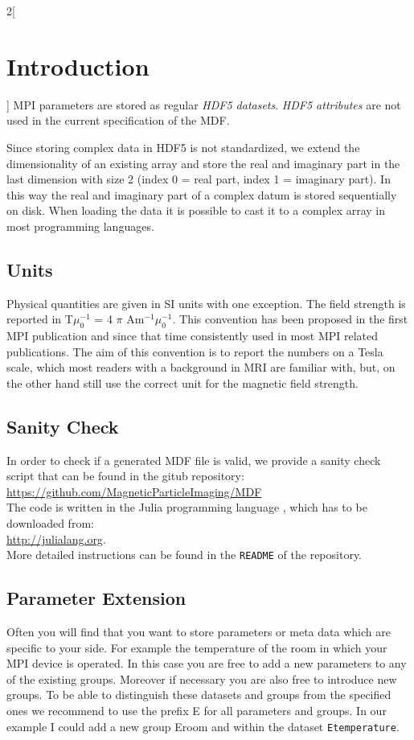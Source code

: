 \documentclass[landscape,a4paper]{article} %
\newcommand{\inl}[1]{\lstinline[columns=fixed]{#1}}
\newcommand{\inlvar}[1]{{\ttfamily#1}}
\begin{document}
\begin{multicols}{2}[\section{Introduction} \label{Sec:Introduction}]
MPI parameters are stored as regular \textit{HDF5 datasets}. \textit{HDF5 attributes} are not used in the current specification of the MDF.

Since storing complex data in HDF5 is not standardized, we extend the dimensionality of an existing array and store the real and imaginary part in the last dimension with size 2 (index 0 = real part, index 1 = imaginary part). In this way the real and imaginary part of a complex datum is stored sequentially on disk. When loading the data it is possible to cast it to a complex array in most programming languages.

\subsection{Units}

Physical quantities are given in SI units with one exception. The field strength is reported in T$\mu_0^{-1}$ = 4 $\pi$ Am$^{-1}\mu_0^{-1}$. This convention has been proposed in the first MPI publication and since that time consistently used in most MPI related publications. The aim of this convention is to report the numbers on a Tesla scale, which most readers with a background in MRI are familiar with, but, on the other hand still use the correct unit for the magnetic field strength.


\subsection{Sanity Check}

In order to check if a generated MDF file is valid, we provide a sanity check script that can be found in the gitub repository:\\
\hspace*{1cm}\url{https://github.com/MagneticParticleImaging/MDF}\\
The code is written in the Julia programming language \cite{Bezanson2012,Bezanson2014,Bezanson2014a}, which has to be downloaded from: \\
\hspace*{1cm} \url{http://julialang.org}.\\
More detailed instructions can be found in the \texttt{README} of the repository.

\subsection{Parameter Extension}

Often you will find that you want to store parameters or meta data which are specific to your side. For example the temperature of the room in which your MPI device is operated. In this case you are free to add a new parameters to any of the existing groups. Moreover if necessary you are also free to introduce new groups. To be able to distinguish these datasets and groups from the specified ones we recommend to use the prefix \inlvar{E} for all parameters and groups. In our example I could add a new group \inlvar{Eroom} and within the dataset \inl{Etemperature}.


\end{multicols}
\end{document}
